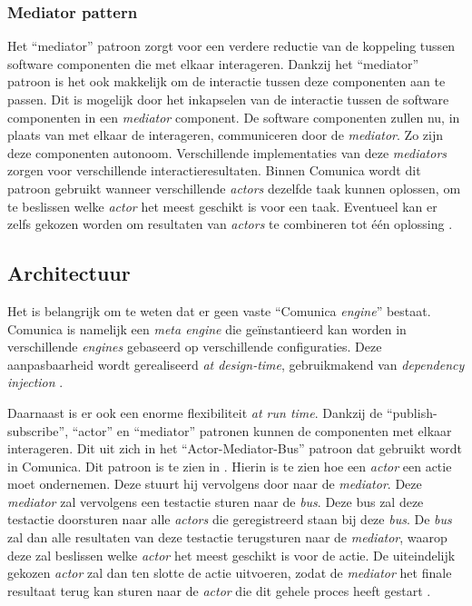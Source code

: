 \subsubsection{Mediator pattern}
Het ``mediator'' patroon zorgt voor een verdere reductie van de koppeling tussen software componenten die met elkaar interageren. Dankzij het ``mediator'' patroon is het ook makkelijk om de interactie tussen deze componenten aan te passen. Dit is mogelijk door het inkapselen van de interactie tussen de software componenten in een \textit{mediator} component. De software componenten zullen nu, in plaats van met elkaar de interageren, communiceren door de \textit{mediator}. Zo zijn deze componenten autonoom. Verschillende implementaties van deze \textit{mediators} zorgen voor verschillende interactieresultaten. Binnen Comunica wordt dit patroon gebruikt wanneer verschillende \textit{actors} dezelfde taak kunnen oplossen, om te beslissen welke \textit{actor} het meest geschikt is voor een taak. Eventueel kan er zelfs gekozen worden om resultaten van \textit{actors} te combineren tot één oplossing \cite{taelman2018comunica}.


\subsection{Architectuur}
Het is belangrijk om te weten dat er geen vaste ``Comunica \textit{engine}'' bestaat. Comunica is namelijk een \textit{meta engine} die geïnstantieerd kan worden in verschillende \textit{engines} gebaseerd op verschillende configuraties. Deze aanpasbaarheid wordt gerealiseerd \textit{at design-time}, gebruikmakend van \textit{dependency injection} \cite{taelman2018comunica}. 

Daarnaast is er ook een enorme flexibiliteit \textit{at run time}. Dankzij de ``publish-subscribe'', ``actor'' en ``mediator'' patronen kunnen de componenten met elkaar interageren. Dit uit zich in het ``Actor-Mediator-Bus'' patroon dat gebruikt wordt in Comunica. Dit patroon is te zien in . Hierin is te zien hoe een \textit{actor} een actie moet ondernemen. Deze stuurt hij vervolgens door naar de \textit{mediator}. Deze \textit{mediator} zal vervolgens een testactie sturen naar de \textit{bus}. Deze bus zal deze testactie doorsturen naar alle \textit{actors} die geregistreerd staan bij deze \textit{bus}. De \textit{bus} zal dan alle resultaten van deze testactie terugsturen naar de \textit{mediator}, waarop deze zal beslissen welke \textit{actor} het meest geschikt is voor de actie. De uiteindelijk gekozen \textit{actor} zal dan ten slotte de actie uitvoeren, zodat de \textit{mediator} het finale resultaat terug kan sturen naar de \textit{actor} die dit gehele proces heeft gestart \cite{taelman2018comunica}.

